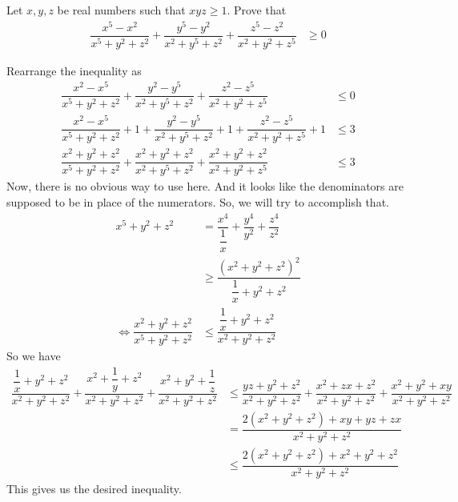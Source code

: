 \documentclass{subfile}
\begin{document}
		\begin{problem}\label{prob:imo2005-3}
			Let $x,y,z$ be real numbers such that $xyz\geq1$. Prove that
				\begin{align*}
					\dfrac{x^{5}-x^{2}}{x^{5}+y^{2}+z^{2}}+\dfrac{y^{5}-y^{2}}{x^{2}+y^{5}+z^{2}}+\dfrac{z^{5}-z^{2}}{x^{2}+y^{2}+z^{5}}
						& \geq0
				\end{align*}
			
				\begin{solution}
					Rearrange the inequality as
						\begin{align*}
							\dfrac{x^{2}-x^{5}}{x^{5}+y^{2}+z^{2}}+\dfrac{y^{2}-y^{5}}{x^{2}+y^{5}+z^{2}}+\dfrac{z^{2}-z^{5}}{x^{2}+y^{2}+z^{5}}
								& \leq 0\\
							\dfrac{x^{2}-x^{5}}{x^{5}+y^{2}+z^{2}}+1+\dfrac{y^{2}-y^{5}}{x^{2}+y^{5}+z^{2}}+1+\dfrac{z^{2}-z^{5}}{x^{2}+y^{2}+z^{5}}+1
								& \leq 3\\
							\dfrac{x^{2}+y^{2}+z^{2}}{x^{5}+y^{2}+z^{2}}+\dfrac{x^{2}+y^{2}+z^{2}}{x^{2}+y^{5}+z^{2}}+\dfrac{x^{2}+y^{2}+z^{2}}{x^{2}+y^{2}+z^{5}}
								& \leq 3
						\end{align*}
					Now, there is no obvious way to use  here. And it looks like the denominators are supposed to be in place of the numerators. So, we will try to accomplish that.
						\begin{align*}
							x^{5}+y^{2}+z^{2}
								& = \dfrac{x^{4}}{\dfrac{1}{x}}+\dfrac{y^{4}}{y^{2}}+\dfrac{z^{4}}{z^{2}}\\
								& \geq \dfrac{(x^{2}+y^{2}+z^{2})^{2}}{\dfrac{1}{x}+y^{2}+z^{2}}\\
							\iff \dfrac{x^{2}+y^{2}+z^{2}}{x^{5}+y^{2}+z^{2}}
								& \leq \dfrac{\dfrac{1}{x}+y^{2}+z^{2}}{x^{2}+y^{2}+z^{2}}
						\end{align*}
					So we have
						\begin{align*}
							\dfrac{\dfrac{1}{x}+y^{2}+z^{2}}{x^{2}+y^{2}+z^{2}}+\dfrac{x^{2}+\dfrac{1}{y}+z^{2}}{x^{2}+y^{2}+z^{2}}+\dfrac{x^{2}+y^{2}+\dfrac{1}{z}}{x^{2}+y^{2}+z^{2}}
								& \leq \dfrac{yz+y^{2}+z^{2}}{x^{2}+y^{2}+z^{2}}+\dfrac{x^{2}+zx+z^{2}}{x^{2}+y^{2}+z^{2}}+\dfrac{x^{2}+y^{2}+xy}{x^{2}+y^{2}+z^{2}}\\
								& = \dfrac{2(x^{2}+y^{2}+z^{2})+xy+yz+zx}{x^{2}+y^{2}+z^{2}}\\
								& \leq \dfrac{2(x^{2}+y^{2}+z^{2})+x^{2}+y^{2}+z^{2}}{x^{2}+y^{2}+z^{2}}
						\end{align*}
					This gives us the desired inequality.
				\end{solution}
		\end{problem}
\end{document}
